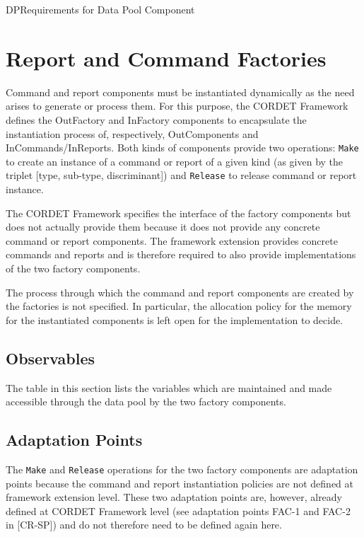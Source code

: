 \documentclass{pnp_article}
\begin{document}
\begin{crReq}{DP}{Requirements for Data Pool Component}
\end{crReq}

\section{Report and Command Factories}\label{sec:repCmdFactories}
Command and report components must be instantiated dynamically as the need arises to generate or process them. For this purpose, the CORDET Framework defines the OutFactory and InFactory components to encapsulate the instantiation process of, respectively, OutComponents and InCommands/InReports. Both kinds of components provide two operations: \texttt{Make} to create an instance of a command or report of a given kind (as given by the triplet [type, sub-type, discriminant]) and \texttt{Release} to release command or report instance.

The CORDET Framework specifies the interface of the factory components but does not actually provide them because it does not provide any concrete command or report components. The framework extension provides concrete commands and reports and is therefore required to also provide implementations of the two factory components.

The process through which the command and report components are created by the factories is not specified. In particular, the allocation policy for the memory for the instantiated components is left open for the implementation to decide.

\subsection{Observables}
The table in this section lists the variables which are maintained and made accessible through the data pool by the two factory components.


\subsection{Adaptation Points}
The \texttt{Make} and \texttt{Release} operations for the two factory components are adaptation points because the command and report instantiation policies are not defined at framework extension level. These two adaptation points are, however, already defined at CORDET Framework level (see adaptation points FAC-1 and FAC-2 in [CR-SP]) and do not therefore need to be defined again here.
\end{document}
